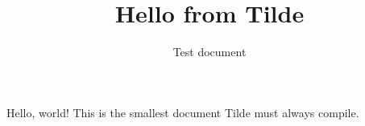 \documentclass{article}
\title{Hello from Tilde}
\author{Test document}
\date{}
\begin{document}
\maketitle

Hello, world! This is the smallest document Tilde must always compile.
\end{document}
